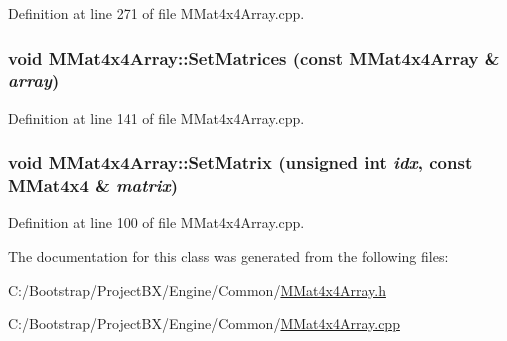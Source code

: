 Definition at line 271 of file MMat4x4Array.cpp.\hypertarget{class_m_mat4x4_array_2e2597b453cc99481883f83acb7318d5}{
\subsubsection[{SetMatrices}]{\setlength{\rightskip}{0pt plus 5cm}void MMat4x4Array::SetMatrices (const {\bf MMat4x4Array} \& {\em array})}}
\label{class_m_mat4x4_array_2e2597b453cc99481883f83acb7318d5}




Definition at line 141 of file MMat4x4Array.cpp.\hypertarget{class_m_mat4x4_array_5be2cd90f44b396e64a7715e11e8ac40}{
\subsubsection[{SetMatrix}]{\setlength{\rightskip}{0pt plus 5cm}void MMat4x4Array::SetMatrix (unsigned int {\em idx}, \/  const {\bf MMat4x4} \& {\em matrix})}}
\label{class_m_mat4x4_array_5be2cd90f44b396e64a7715e11e8ac40}




Definition at line 100 of file MMat4x4Array.cpp.

The documentation for this class was generated from the following files:\begin{CompactItemize}
\item 
C:/Bootstrap/ProjectBX/Engine/Common/\hyperlink{_m_mat4x4_array_8h}{MMat4x4Array.h}\item 
C:/Bootstrap/ProjectBX/Engine/Common/\hyperlink{_m_mat4x4_array_8cpp}{MMat4x4Array.cpp}\end{CompactItemize}
